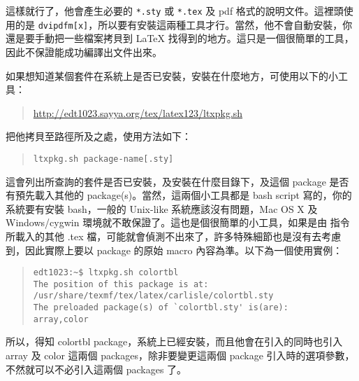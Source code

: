 這樣就行了，他會產生必要的 \texttt{*.sty} 或 \texttt{*.tex} 及 pdf 格式的說明文件。這裡頭使用的是 \texttt{dvipdfm[x]}，所以要有安裝這兩種工具才行。當然，他不會自動安裝，你還是要手動把一些檔案拷貝到 \LaTeX{} 找得到的地方。這只是一個很簡單的工具，因此不保證能成功編譯出文件出來。

如果想知道某個套件在系統上是否已安裝，安裝在什麼地方，可使用以下的小工具：

\begin{quote}
  \url{http://edt1023.sayya.org/tex/latex123/ltxpkg.sh}
\end{quote}

把他拷貝至路徑所及之處，使用方法如下：

\begin{quote}
  \begin{verbatim}
ltxpkg.sh package-name[.sty]
\end{verbatim}
\end{quote}

這會列出所查詢的套件是否已安裝，及安裝在什麼目錄下，及這個 package 是否有預先載入其他的 package(s)。當然，這兩個小工具都是 bash script 寫的，你的系統要有安裝 bash，一般的 Unix-like 系統應該沒有問題，Mac OS X 及 Windows/cygwin 環境就不敢保證了。這也是個很簡單的小工具，如果是由 \verb|| 指令所載入的其他 {\ttfamily .tex} 檔，可能就會偵測不出來了，許多特殊細節也是沒有去考慮到，因此實際上要以 package 的原始 macro 內容為準。以下為一個使用實例：

\begin{quote}
  \begin{verbatim}
edt1023:~$ ltxpkg.sh colortbl
The position of this package is at:
/usr/share/texmf/tex/latex/carlisle/colortbl.sty
The preloaded package(s) of `colortbl.sty' is(are):
array,color
\end{verbatim}
\end{quote}

所以，得知 {\sffamily colortbl} package，系統上已經安裝，而且他會在引入的同時也引入 {\sffamily array} 及 {\sffamily color} 這兩個 packages，除非要變更這兩個 package 引入時的選項參數，不然就可以不必引入這兩個 packages 了。





